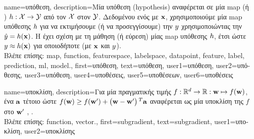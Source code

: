 {name={\foreignlanguage{greek}{υπόθεση}},
	description={\foreignlanguage{greek}{Μία υπόθεση} (hypothesis) 
		\foreignlanguage{greek}{αναφέρεται σε μία} \gls{map} \foreignlanguage{greek}{(ή} ) 
		$h: \mathcal{X} \rightarrow \mathcal{Y}$ \foreignlanguage{greek}{από τον}  
		 $\mathcal{X}$ \foreignlanguage{greek}{στον}  $\mathcal{Y}$. 
		\foreignlanguage{greek}{Δεδομένου ενός}  \foreignlanguage{greek}{με}  ${\bf x}$, 
		\foreignlanguage{greek}{χρησιμοποι\-ού\-με μία} \gls{map} \foreignlanguage{greek}{υπόθεσης $h$
		για να εκτιμήσουμε (ή να προσεγγίσουμε) την}  $y$ \foreignlanguage{greek}{χρησιμοποιώντας την} 
		 $\hat{y} = h({\bf x})$. \foreignlanguage{greek}{Η}  
		\foreignlanguage{greek}{έχει σχέση με τη μάθηση (ή εύρεση) μίας} \gls{map} \foreignlanguage{greek}{υπόθεσης 
		$h$, έτσι ώστε $y \approx h({\bf x})$ 
		για οποιοδήποτε}  \foreignlanguage{greek}{(με}  ${\bf x}$ 
		\foreignlanguage{greek}{και}  $y$).\\
		\foreignlanguage{greek}{Βλέπε επίσης:} \gls{map}, \gls{function}, \gls{featurespace}, \gls{labelspace}, \gls{datapoint}, \gls{feature}, 
		\gls{label}, \gls{prediction}, \gls{ml}, \gls{model}.},
	first={\foreignlanguage{greek}{υπόθεση}},
	text={\foreignlanguage{greek}{υπόθεση}},
	user1={\foreignlanguage{greek}{υπόθεση}}, %
	user2={\foreignlanguage{greek}{υπόθεσης}}, %
	user3={\foreignlanguage{greek}{υπόθεση}}, %
	user4={\foreignlanguage{greek}{υποθέσεις}}, %
	user5={\foreignlanguage{greek}{υποθέσεων}}, %
	user6={\foreignlanguage{greek}{υποθέσεις}} %
}

{name={\foreignlanguage{greek}{υποκλίση}},
	description={\foreignlanguage{greek}{Για μία}  
		\foreignlanguage{greek}{πραγματικής τιμής $f: \mathbb{R}^{d} \rightarrow \mathbb{R}: {\bf w} \mapsto f({\bf w})$, 
		ένα}  \foreignlanguage{greek}{${\bf a}$ τέτοιο ώστε $f({\bf w}) \geq  f({\bf w}') +\big({\bf w}-{\bf w}' \big)\,^{T} {\bf a}$ 
		αναφέρεται ως μία υποκλίση της $f$ στο} ${\bf w}'$ \cite{BertCvxAnalOpt}, \cite{BertsekasNonLinProgr}.\\
		\foreignlanguage{greek}{Βλέπε επίσης:} \gls{function}, \gls{vector}.},
	first={subgradient},
	text={subgradient},
	user1={\foreignlanguage{greek}{υποκλίση}}, %
	user2={\foreignlanguage{greek}{υποκλίσης}} %
}

